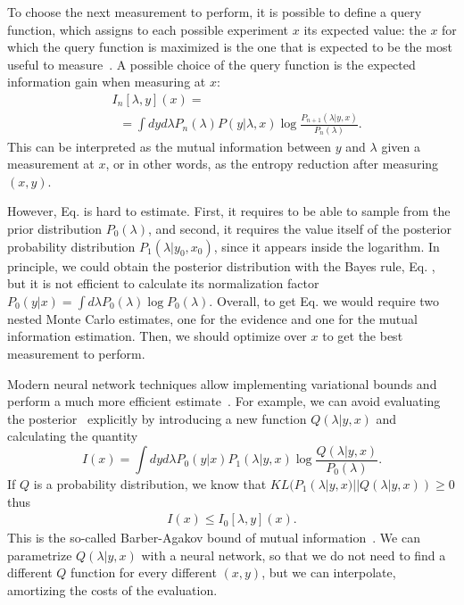 \documentclass[10pt]{iopart}  %
\begin{document}
To choose the next measurement to perform, it is possible to define a query function, which assigns to each possible experiment $x$ its expected value: the $x$ for which the query function is maximized is the one that is expected to be the most useful to measure~\cite{settles_active_2012}.
A possible choice of the query function is the expected information gain when measuring at $x$:
\begin{align}
    \label{eq:information-gain}
     & I_n[\lambda,y](x)= \nonumber                                                                     \\
     & \;\;=\int dy d\lambda P_n(\lambda)P(y|\lambda,x) \log \frac{P_{n+1}(\lambda|y,x)}{P_n(\lambda)}.
\end{align}
This can be interpreted as the mutual information between $y$ and $\lambda$ given a measurement at $x$, or in other words, as the entropy reduction after measuring $(x,y)$.

However, Eq.  is hard to estimate.
First, it requires to be able to sample from the prior distribution $P_0(\lambda)$, and second, it requires the value itself of the posterior probability distribution $P_1(\lambda|y_0,x_0)$, since it appears inside the logarithm.
In principle, we could obtain the posterior distribution with the Bayes rule, Eq. , but it is not efficient to calculate its normalization factor $P_0(y|x)=\int d\lambda P_0(\lambda) \log P_0(\lambda)$.
Overall, to get Eq.  we would require two nested Monte Carlo estimates, one for the evidence and one for the mutual information estimation.
Then, we should optimize over $x$ to get the best measurement to perform.

Modern neural network techniques allow implementing variational bounds and perform a much more efficient estimate~\cite{kleinegesse_gradient-based_2021}.
For example, we can avoid  evaluating the posterior~\cite{foster_unified_2020} explicitly by introducing a new function $Q(\lambda|y,x)$ and calculating the quantity
\begin{equation}
    \label{eq:information-gain0}
    I(x) = \int dy d\lambda
    P_0(y|x) P_1(\lambda|y,x) \log \frac{Q(\lambda|y,x)}{P_0(\lambda)}.
\end{equation}
If $Q$ is a probability distribution, we know that $KL(P_1(\lambda|y,x)||Q(\lambda|y,x))\geq 0$ thus
\begin{align}
    \label{eq:information-gain1}
    I(x) \leq I_0[\lambda,y](x).
\end{align}
This is the so-called Barber-Agakov bound of mutual information~\cite{barber_im_2003}.
We can parametrize $Q(\lambda|y,x)$ with a neural network, so that we do not need to find a different $Q$ function for every different $(x,y)$, but we can interpolate, amortizing the costs of the evaluation.
\end{document}
